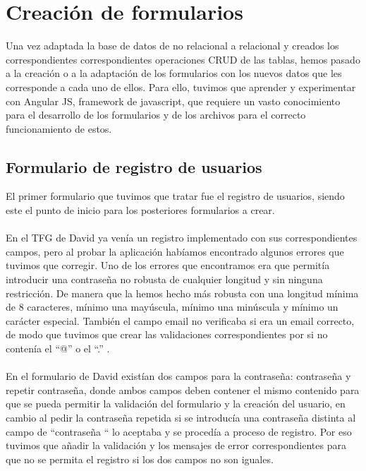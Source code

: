 \documentclass[11pt]{article}
\begin{document}

\tableofcontents
\newpage

\section{Creación de formularios}
Una vez adaptada la base de datos de no relacional a relacional y creados los correspondientes correspondientes operaciones CRUD de las tablas, hemos pasado a la creación o a la adaptación de los formularios con los nuevos datos que les corresponde a cada uno de ellos. Para ello, tuvimos que aprender y experimentar con Angular JS, framework de javascript, que requiere un vasto conocimiento para el desarrollo de los formularios y de los archivos para el correcto funcionamiento de estos. 
\subsection{Formulario de registro de usuarios}
El primer formulario que tuvimos que tratar fue el registro de usuarios, siendo este el punto de inicio para los posteriores formularios a crear.\\\\
En el TFG de David ya venía un registro implementado con sus correspondientes campos, pero al probar la aplicación habíamos encontrado algunos errores que tuvimos que corregir. Uno de los errores que encontramos era que permitía introducir una contraseña no robusta de cualquier longitud y sin ninguna restricción. De manera que la hemos hecho más robusta con una longitud mínima de 8 caracteres, mínimo una mayúscula, mínimo una minúscula y mínimo un carácter especial. También el campo email no verificaba si era un email correcto, de modo que tuvimos que crear las validaciones correspondientes por si no contenía el “@” o el “.” .\\\\
 En el formulario de David existían dos campos para la contraseña: contraseña y repetir contraseña, donde ambos campos deben contener el mismo contenido para que se pueda permitir la validación del formulario y la creación del usuario, en cambio al pedir la contraseña repetida si se introducía una contraseña distinta al campo de “contraseña “ lo aceptaba y se procedía a proceso de registro. Por eso tuvimos que añadir la validación y los mensajes de error correspondientes para que no se permita el registro si los dos campos no son iguales.\\\\
\end{document}
